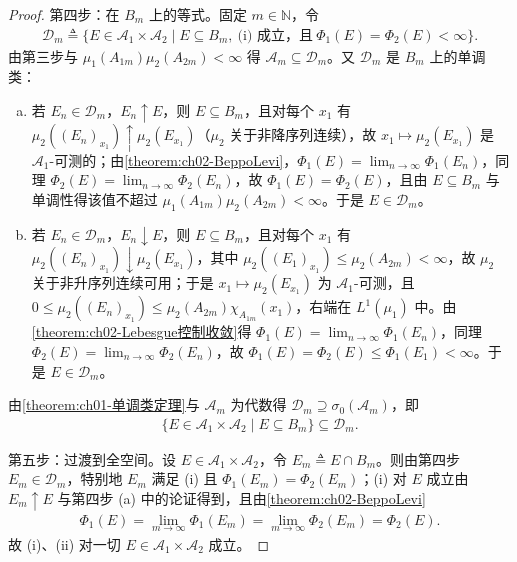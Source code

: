 \documentclass[../../main.tex]{subfiles}%
\begin{document}
\begin{proof}
第四步：在 $B_m$ 上的等式。固定 $m\in\mathbb N$，令
\begin{align*}
\mathscr D_m\triangleq\big\{E\in\mathscr A_1\times\mathscr A_2\mid E\subseteq B_m,\ \text{(i) 成立，且}\ \Phi_1(E)=\Phi_2(E)<\infty\big\}.
\end{align*}
由第三步与 $\mu_1(A_{1m})\mu_2(A_{2m})<\infty$ 得 $\mathscr A_m\subseteq\mathscr D_m$。又 $\mathscr D_m$ 是 $B_m$ 上的单调类：
\begin{enumerate}[(a)]
\item 若 $E_n\in\mathscr D_m$，$E_n\uparrow E$，则 $E\subseteq B_m$，且对每个 $x_1$ 有 $\mu_2((E_n)_{x_1})\uparrow\mu_2(E_{x_1})$（$\mu_2$ 关于非降序列连续），故 $x_1\mapsto\mu_2(E_{x_1})$ 是 $\mathscr A_1$-可测的；由\cref{theorem:ch02-BeppoLevi}，$\Phi_1(E)=\lim_{n\to\infty}\Phi_1(E_n)$，同理 $\Phi_2(E)=\lim_{n\to\infty}\Phi_2(E_n)$，故 $\Phi_1(E)=\Phi_2(E)$，且由 $E\subseteq B_m$ 与单调性得该值不超过 $\mu_1(A_{1m})\mu_2(A_{2m})<\infty$。于是 $E\in\mathscr D_m$。
\item 若 $E_n\in\mathscr D_m$，$E_n\downarrow E$，则 $E\subseteq B_m$，且对每个 $x_1$ 有 $\mu_2((E_n)_{x_1})\downarrow\mu_2(E_{x_1})$，其中 $\mu_2((E_1)_{x_1})\leqslant\mu_2(A_{2m})<\infty$，故 $\mu_2$ 关于非升序列连续可用；于是 $x_1\mapsto\mu_2(E_{x_1})$ 为 $\mathscr A_1$-可测，且 $0\leqslant\mu_2((E_n)_{x_1})\leqslant\mu_2(A_{2m})\chi_{A_{1m}}(x_1)$，右端在 $L^1(\mu_1)$ 中。由\cref{theorem:ch02-Lebesgue控制收敛}得 $\Phi_1(E)=\lim_{n\to\infty}\Phi_1(E_n)$，同理 $\Phi_2(E)=\lim_{n\to\infty}\Phi_2(E_n)$，故 $\Phi_1(E)=\Phi_2(E)\leqslant\Phi_1(E_1)<\infty$。于是 $E\in\mathscr D_m$。
\end{enumerate}
由\cref{theorem:ch01-单调类定理}与 $\mathscr A_m$ 为代数得 $\mathscr D_m\supseteq\sigma_0(\mathscr A_m)$，即
\begin{align*}
\{E\in\mathscr A_1\times\mathscr A_2\mid E\subseteq B_m\}\subseteq\mathscr D_m.
\end{align*}

第五步：过渡到全空间。设 $E\in\mathscr A_1\times\mathscr A_2$，令 $E_m\triangleq E\cap B_m$。则由第四步 $E_m\in\mathscr D_m$，特别地 $E_m$ 满足 (i) 且 $\Phi_1(E_m)=\Phi_2(E_m)$；(i) 对 $E$ 成立由 $E_m\uparrow E$ 与第四步 (a) 中的论证得到，且由\cref{theorem:ch02-BeppoLevi}
\begin{align*}
\Phi_1(E)=\lim_{m\to\infty}\Phi_1(E_m)=\lim_{m\to\infty}\Phi_2(E_m)=\Phi_2(E).
\end{align*}
故 (i)、(ii) 对一切 $E\in\mathscr A_1\times\mathscr A_2$ 成立。


\end{proof}
\end{document}

